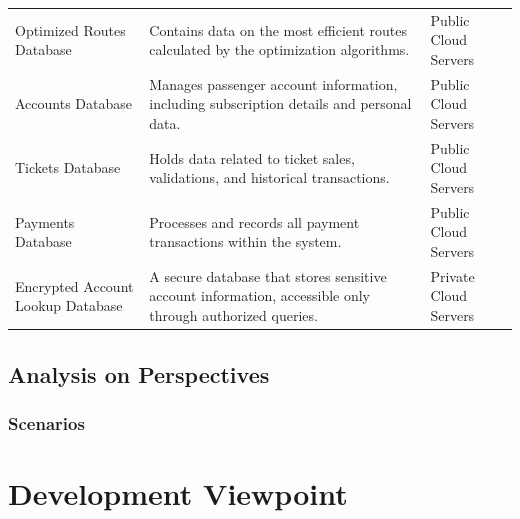 \begin{table}[H]
\begin{tabularx}{\textwidth}{@{}lXX@{}}
    Optimized Routes Database & Contains data on the most efficient routes calculated by the optimization algorithms. & Public Cloud Servers \\
    Accounts Database & Manages passenger account information, including subscription details and personal data. & Public Cloud Servers \\
    Tickets Database & Holds data related to ticket sales, validations, and historical transactions. & Public Cloud Servers \\
    Payments Database & Processes and records all payment transactions within the system. & Public Cloud Servers \\
    Encrypted Account Lookup Database & A secure database that stores sensitive account information, accessible only through authorized queries. & Private Cloud Servers \\
    \bottomrule
    \end{tabularx}
\end{table}

\subsection{Analysis on Perspectives}
\begin{table}[h!]
    \centering
    \caption{Deployment View Prioritized Quality Attributes}
    \label{tab:deployment_view}
\end{table}

\subsubsection{Scenarios}


\section{Development Viewpoint}

